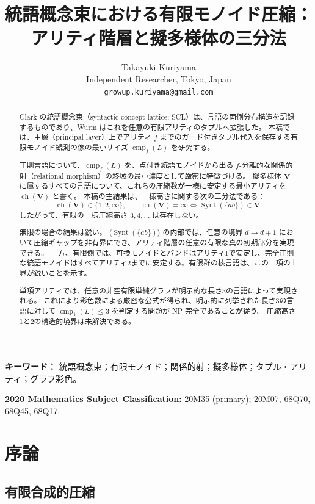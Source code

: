 \documentclass[10pt,a4paper]{ltjsarticle}
\title{統語概念束における有限モノイド圧縮：\\アリティ階層と擬多様体の三分法}
\author{Takayuki Kuriyama\\
Independent Researcher, Tokyo, Japan\\
\texttt{growup.kuriyama@gmail.com}}
\date{}
\theoremstyle{definition}
\theoremstyle{remark}
\newcommand{\cmp}{\operatorname{cmp}}
\begin{document}
\maketitle

\begin{abstract}
Clark の統語概念束（syntactic concept lattice; SCL）は、言語の両側分布構造を記録するものであり、Wurm はこれを任意の有限アリティのタプルへ拡張した。
本稿では、主層（principal layer）上でアリティ $f$ までのガード付きタプル代入を保存する有限モノイド観測の像の最小サイズ
\(\cmp_f(L)\)
を研究する。

正則言語について、\(\cmp_f(L)\) を、点付き統語モノイドから出る $f$-分離的な関係的射（relational morphism）の終域の最小濃度として厳密に特徴づける。
擬多様体 \(\mathbf V\) に属するすべての言語について、これらの圧縮数が一様に安定する最小アリティを \(\operatorname{ch}(\mathbf V)\) と書く。
本稿の主結果は、一様高さに関する次の三分法である：
\[
\operatorname{ch}(\mathbf V)\in\{1,2,\infty\},
\qquad
\operatorname{ch}(\mathbf V)=\infty
\Longleftrightarrow
\operatorname{Synt}(\{ab\})\in\mathbf V.
\]
したがって、有限の一様圧縮高さ $3,4,\ldots$ は存在しない。

無限の場合の結果は鋭い。
\(\langle\operatorname{Synt}(\{ab\})\rangle\) の内部では、任意の境界 $d\to d+1$ において圧縮ギャップを非有界にでき、アリティ階層の任意の有限な真の初期部分を実現できる。
一方、有限側では、可換モノイドとバンドはアリティ1で安定し、完全正則な統語モノイドはすべてアリティ2までに安定する。有限群の核言語は、この二項の上界が鋭いことを示す。

単項アリティでは、任意の非空有限単純グラフが明示的な長さ3の言語によって実現される。
これにより彩色数による厳密な公式が得られ、明示的に列挙された長さ3の言語に対して \(\cmp_1(L)\le3\) を判定する問題が NP 完全であることが従う。
圧縮高さ1と2の構造的境界は未解決である。
\end{abstract}

\noindent\textbf{キーワード：} 統語概念束；有限モノイド；関係的射；擬多様体；タプル・アリティ；グラフ彩色。

\noindent\textbf{2020 Mathematics Subject Classification:}
20M35 (primary); 20M07, 68Q70, 68Q45, 68Q17.

\section{序論}

\subsection{有限合成的圧縮}
\end{document}
